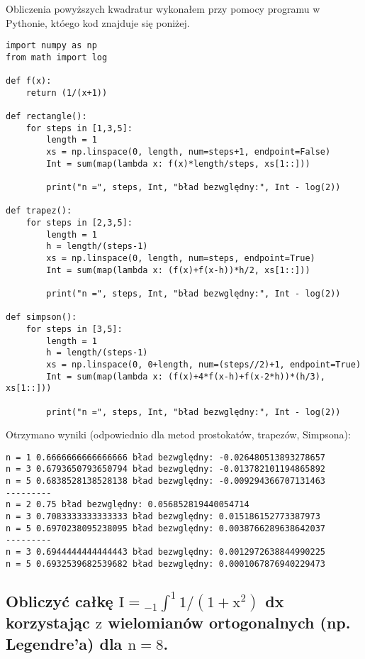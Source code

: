 \documentclass[5]{article}
\begin{document}
Obliczenia powyższych kwadratur wykonałem przy pomocy programu w Pythonie, któego kod znajduje się poniżej.

\begin{verbatim}
import numpy as np
from math import log

def f(x):
    return (1/(x+1))

def rectangle():
    for steps in [1,3,5]:
        length = 1
        xs = np.linspace(0, length, num=steps+1, endpoint=False)
        Int = sum(map(lambda x: f(x)*length/steps, xs[1::]))

        print("n =", steps, Int, "bład bezwględny:", Int - log(2))

def trapez():
    for steps in [2,3,5]:
        length = 1
        h = length/(steps-1)
        xs = np.linspace(0, length, num=steps, endpoint=True)
        Int = sum(map(lambda x: (f(x)+f(x-h))*h/2, xs[1::]))

        print("n =", steps, Int, "bład bezwględny:", Int - log(2))

def simpson():
    for steps in [3,5]:
        length = 1
        h = length/(steps-1)
        xs = np.linspace(0, 0+length, num=(steps//2)+1, endpoint=True)
        Int = sum(map(lambda x: (f(x)+4*f(x-h)+f(x-2*h))*(h/3), xs[1::]))

        print("n =", steps, Int, "bład bezwględny:", Int - log(2))
\end{verbatim}


\newline

Otrzymano wyniki (odpowiednio dla metod prostokatów, trapezów, Simpsona):

\begin{verbatim}
n = 1 0.6666666666666666 bład bezwględny: -0.026480513893278657
n = 3 0.6793650793650794 bład bezwględny: -0.013782101194865892
n = 5 0.6838528138528138 bład bezwględny: -0.009294366707131463
---------
n = 2 0.75 bład bezwględny: 0.056852819440054714
n = 3 0.7083333333333333 bład bezwględny: 0.015186152773387973
n = 5 0.6970238095238095 bład bezwględny: 0.0038766289638642037
---------
n = 3 0.6944444444444443 bład bezwględny: 0.0012972638844990225
n = 5 0.6932539682539682 bład bezwględny: 0.0001067876940229473
\end{verbatim}


\subsection{Obliczyć całkę $\mathrm{I}={ }_{-1} \int^{1} 1 /\left(1+\mathrm{x}^{2}\right)$ dx korzystając $\mathrm{z}$ wielomianów ortogonalnych (np. Legendre'a) dla $\mathrm{n}=8$.}
\end{document}
